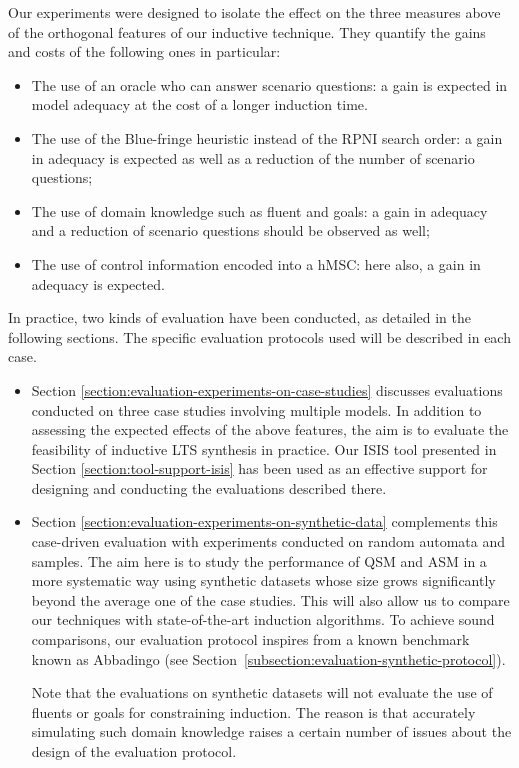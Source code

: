 Our experiments were designed to isolate the effect on the three measures above of the orthogonal features of our inductive technique. They quantify the gains and costs of the following ones in particular:
\begin{itemize}
\item The use of an oracle who can answer scenario questions: a gain is expected in model adequacy at the cost of a longer induction time.
\item The use of the Blue-fringe heuristic instead of the RPNI search order: a gain in adequacy is expected as well as a reduction of the number of scenario questions;
\item The use of domain knowledge such as fluent and goals: a gain in adequacy and a reduction of scenario questions should be observed as well;
\item The use of control information encoded into a hMSC: here also, a gain in adequacy is expected.
\end{itemize}

In practice, two kinds of evaluation have been conducted, as detailed in the following sections. The specific evaluation protocols used will be described in each case.
\begin{itemize}

\item Section \ref{section:evaluation-experiments-on-case-studies} discusses evaluations conducted on three case studies involving multiple models. In addition to assessing the expected effects of the above features, the aim is to evaluate the feasibility of inductive LTS synthesis in practice. Our ISIS tool presented in Section \ref{section:tool-support-isis} has been used as an effective support for designing and conducting the evaluations described there.

\item Section \ref{section:evaluation-experiments-on-synthetic-data} complements this case-driven evaluation with experiments conducted on random automata and samples. The aim here is to study the performance of QSM and ASM in a more systematic way using synthetic datasets whose size grows significantly beyond the average one of the case studies. This will also allow us to compare our techniques with state-of-the-art induction algorithms. To achieve sound comparisons, our evaluation protocol inspires from a known benchmark known as Abbadingo \cite{Lang:1998} (see Section~\ref{subsection:evaluation-synthetic-protocol}).

Note that the evaluations on synthetic datasets will not evaluate the use of fluents or goals for constraining induction. The reason is that accurately simulating such domain knowledge raises a certain number of issues about the design of the evaluation protocol.

\end{itemize}
